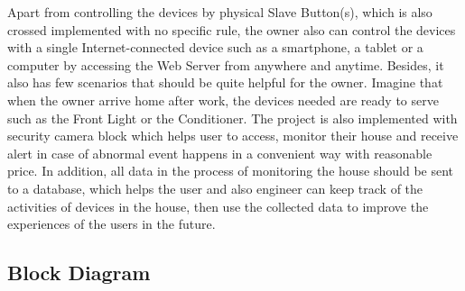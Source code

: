    Apart from controlling the devices by physical Slave Button(s), which is also crossed implemented with no specific rule, the owner also can control the devices with a single Internet-connected device such as a smartphone, a tablet or a computer by accessing the Web Server from anywhere and anytime. Besides, it also has few scenarios that should be quite helpful for the owner. Imagine that when the owner arrive home after work, the devices needed are ready to serve such as the Front Light or the Conditioner. The project is also implemented with security camera block which helps user to access, monitor their house and receive alert in case of abnormal event happens in a convenient way with reasonable price. In addition, all data in the process of monitoring the house should be sent to a database, which helps the user and also engineer can keep track of the activities of devices in the house, then use the collected data to improve the experiences of the users in the future.

    \subsection{Block Diagram}

